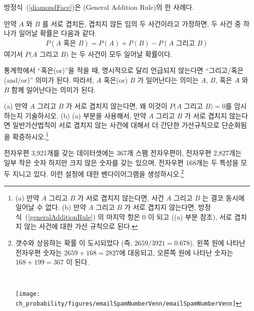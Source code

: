 방정식~(\ref{diamondFace})은 (General Addition Rule)의 한 사례다.

\begin{termBox}{ 만약 $A$ 와 $B$ 를 서로 겹치든, 겹치지 않든 임의 두 사건이라고 가정하면, 두 사건 중 하나가 일어날 확률은 다음과 같다.
\begin{eqnarray}
P(A\text{ 혹은 }B) = P(A) + P(B) - P(A\text{ 그리고 }B)
\label{generalAdditionRule}
\end{eqnarray}
여기서 $P(A$ 그리고 $B)$ 는 두 사건이 모두 일어날 확률이다.}
\end{termBox}

\begin{tipBox}{
통계학에서 ``혹은(or)''을 적을 때, 명시적으로 달리 언급되지 않는다면 ``그리고/혹은 (and/or)'' 의미가 된다. 따라서, $A$ 혹은(or) $B$ 가 일어난다는 의미는 $A$, $B$, 혹은 $A$ 와 $B$ 함께 일어난다는 의미가 된다.}
\end{tipBox}

\begin{exercise}
(a) 만약 $A$ 그리고 $B$ 가 서로 겹치지 않는다면, 왜 이것이 $P(A$ 그리고 $B) = 0$를 암시하는지 기술하시오. (b) (a) 부분을 사용해서, 만약 $A$ 그리고 $B$ 가 서로 겹치지 않는다면 일반가산법칙이 서로 겹치지 않는 사건에 대해서 더 간단한 가산규칙으로 단순화됨을 확증하시오.\footnote{(a) 만약 $A$ 그리고 $B$ 가 서로 겹치지 않는다면, 사건 $A$ 그리고 $B$ 는 결코 동시에 일어날 수 없다. (b) 만약 $A$ 그리고 $B$ 가 서로 겹치지 않는다면, 방정식~(\ref{generalAdditionRule}) 의 마지막 항은 0 이 되고 ((a) 부분 참조), 서로 겹치지 않는 사건에 대한 가산 규칙으로 된다.}
\end{exercise}


\begin{exercise}\label{emailSpamNumberVennExer}
전자우편 3,921개를 갖는  데이터셋에는 367개 스팸 전자우편이, 전자우편 2,827개는 일부 작은 숫자 하지만 크지 않은 숫자를 갖는 있으며, 전자우편 168개는 두 특성을 모두 지니고 있다. 이런 설정에 대한 벤다이어그램을 생성하시오.\footnote{%
\begin{minipage}[t]{0.65\textwidth}
갯수와 상응하는 {\color{oiB}확률} 이 도시되었다 (즉, $2659/3921 = 0.678$). 왼쪽 원에 나타난 전자우편 숫자는 $2659 + 168 = 2827$에 대응되고, 오른쪽 원에 나타난 숫자는 $168 + 199 = 367$ 이 된다.
\end{minipage}\ %
\begin{minipage}[c]{0.3\textwidth}
\hfill\texttt{[image: ch\_probability/figures/emailSpamNumberVenn/emailSpamNumberVenn]} \vspace{-13mm}
\end{minipage}
}
\end{exercise}

